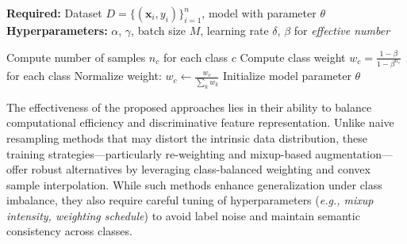 \begin{algorithm}[htb]
\SetAlgoLined

\textbf{Required:} Dataset $D = \{(\mathbf{x}_i, y_i)\}_{i=1}^n$, model with parameter $\theta$\;
\textbf{Hyperparameters:} $\alpha$, $\gamma$, batch size $M$, learning rate $\delta$, $\beta$ for \textit{effective number}\;

Compute number of samples $n_c$ for each class $c$\;
Compute class weight $w_c = \frac{1 - \beta}{1 - \beta^{n_c}}$ for each class\;
Normalize weight: $w_c \gets \frac{w_c}{\sum_k w_k}$\;
Initialize model parameter $\theta$\;


\caption{Light-weight data augmentation framework training algorithm.}
\label{alg:lightweight-augmentation}
\end{algorithm}

The effectiveness of the proposed approaches lies in their ability to balance computational efficiency and discriminative feature representation. Unlike naive resampling methods that may distort the intrinsic data distribution, these training strategies—particularly re-weighting and mixup-based augmentation—offer robust alternatives by leveraging class-balanced weighting and convex sample interpolation. While such methods enhance generalization under class imbalance, they also require careful tuning of hyperparameters (\textit{e.g., mixup intensity, weighting schedule}) to avoid label noise and maintain semantic consistency across classes.

